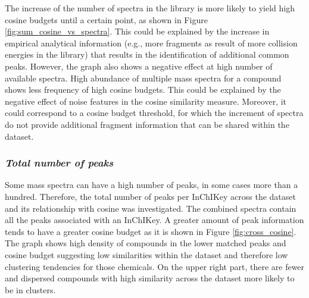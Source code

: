 The increase of the number of spectra in the library is more likely to yield high cosine budgets until a certain point, as shown in Figure \ref{fig:sum_cosine_vs_spectra}. This could be explained by the increase in empirical analytical information (e.g., more fragments as result of more collision energies in the library) that results in the identification of additional common peaks. However, the graph also shows a negative effect at high number of available spectra. High abundance of multiple mass spectra for a compound shows less frequency of high cosine budgets. This could be explained by the negative effect of noise features in the cosine similarity measure. Moreover, it could correspond to a cosine budget threshold, for which the increment of spectra do not provide additional fragment information that can be shared within the dataset. 

\subsubsection*{\textit{Total number of peaks}}

Some mass spectra can have a high number of peaks, in some cases more than a hundred. Therefore, the total number of peaks per InChIKey across the dataset and its relationship with cosine was investigated. The combined spectra contain all the peaks associated with an InChIKey. A greater amount of peak information tends to have a greater cosine budget as it is shown in Figure \ref{fig:cross_cosine}. The graph shows high density of compounds in the lower matched peaks and cosine budget suggesting low similarities within the dataset and therefore low clustering tendencies for those chemicals. On the upper right part, there are fewer and dispersed compounds with high similarity across the dataset more likely to be in clusters.

